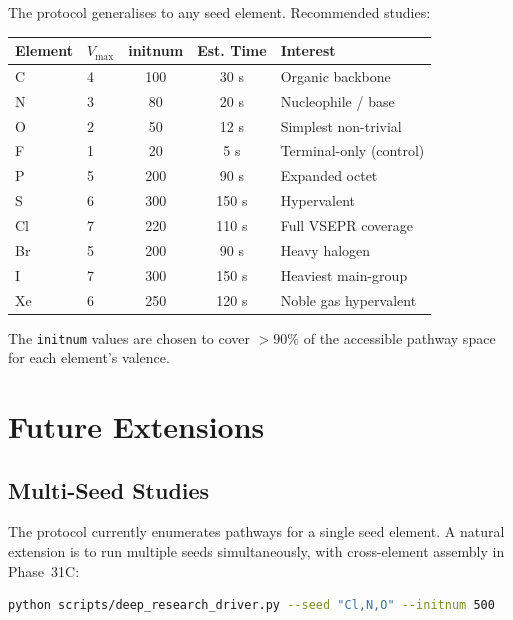 \documentclass[11pt,a4paper]{article}
\begin{document}
The protocol generalises to any seed element.  Recommended studies:

\begin{center}
\begin{tabular}{llccl}
\toprule
\textbf{Element} & \textbf{$V_\text{max}$} & \textbf{initnum}
  & \textbf{Est. Time} & \textbf{Interest} \\
\midrule
C  & 4 &  100 &  30 s & Organic backbone \\
N  & 3 &   80 &  20 s & Nucleophile / base \\
O  & 2 &   50 &  12 s & Simplest non-trivial \\
F  & 1 &   20 &   5 s & Terminal-only (control) \\
P  & 5 &  200 &  90 s & Expanded octet \\
S  & 6 &  300 & 150 s & Hypervalent \\
Cl & 7 &  220 & 110 s & Full VSEPR coverage \\
Br & 5 &  200 &  90 s & Heavy halogen \\
I  & 7 &  300 & 150 s & Heaviest main-group \\
Xe & 6 &  250 & 120 s & Noble gas hypervalent \\
\bottomrule
\end{tabular}
\end{center}

\noindent The \texttt{initnum} values are chosen to cover $>90\%$ of the
accessible pathway space for each element's valence.

\section{Future Extensions}
\label{sec:future}

\subsection{Multi-Seed Studies}

The protocol currently enumerates pathways for a single seed element.
A natural extension is to run multiple seeds simultaneously, with
cross-element assembly in Phase~31C:

\begin{lstlisting}[language=bash]
python scripts/deep_research_driver.py --seed "Cl,N,O" --initnum 500
\end{lstlisting}
\end{document}

